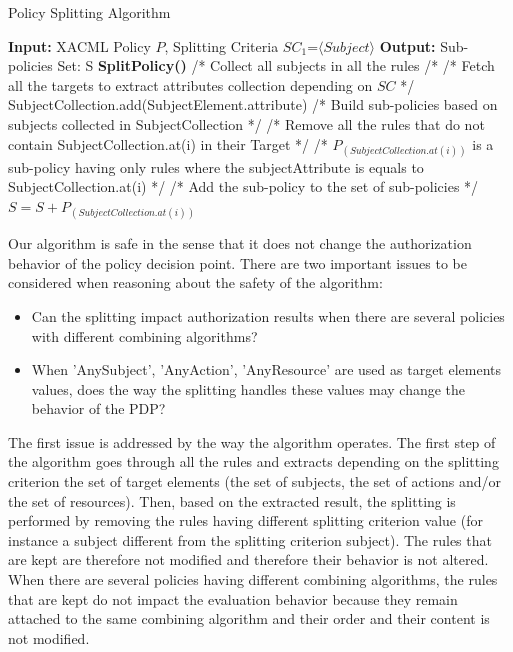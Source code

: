 \begin{algorithmic}
\begin{algorithm}[t]
\caption{Policy Splitting Algorithm}
\STATE \textbf{Input:} XACML Policy $P$, Splitting Criteria $SC_{1}$=$\langle Subject \rangle$
\STATE \textbf{Output:} Sub-policies Set: S
\STATE \textbf{SplitPolicy()}
\STATE /* Collect all subjects in all the rules /*
\STATE /* Fetch all the targets to extract attributes collection depending on $SC$ */
\STATE SubjectCollection.add(SubjectElement.attribute)
\ENDFOR
\ENDFOR
\STATE /* Build sub-policies based on subjects collected in SubjectCollection */
\STATE /* Remove all the rules that do not contain SubjectCollection.at(i) in their Target */
\ENDIF 
\ENDIF
\ENDFOR
\STATE /* $P_{(SubjectCollection.at(i))}$ is a sub-policy having only rules where the subjectAttribute is equals to SubjectCollection.at(i) */
\STATE /* Add the sub-policy to the set of sub-policies */
\STATE $S=S+P_{(SubjectCollection.at(i))}$
\ENDFOR
\end{algorithm}
\end{algorithmic}

Our algorithm is safe in the sense that it does not change the authorization behavior of the policy decision point. 
There are two important issues to be considered when reasoning about the safety of the algorithm:
\begin{itemize}
 \item Can the splitting impact authorization results when there are several policies with different combining algorithms?
 \item When 'AnySubject', 'AnyAction', 'AnyResource' are used as target elements values, does the way the splitting handles
 these values may change the behavior of the PDP?
\end{itemize}
The first issue is addressed by the way the algorithm operates. The first step of the algorithm goes through all the rules and extracts 
depending on the splitting criterion the set of target elements (the set of subjects, 
the set of actions and/or the set of resources). Then, based on the extracted result, the splitting is performed by removing 
the rules having different splitting criterion value (for instance a subject different from 
the splitting criterion subject). The rules that are kept are therefore not modified and therefore their behavior is not altered. When there 
are several policies having different combining algorithms, the rules that are kept do not impact the evaluation behavior 
because they remain attached to the same combining algorithm and their order and their content is not modified.


